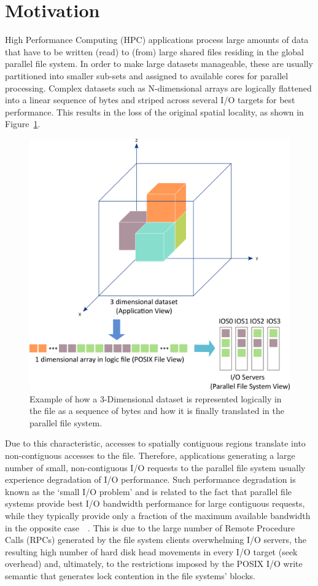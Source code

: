 \section{Motivation}
\label{sec: motivation}
High Performance Computing (HPC) applications process large amounts of data that have to be written (read) to (from) large shared files residing in the global parallel file system. In order to make large datasets manageable, these are usually partitioned into smaller sub-sets and assigned to available cores for parallel processing. Complex datasets such as N-dimensional arrays are logically flattened into a linear sequence of bytes and striped across several I/O targets for best performance. This results in the loss of the original spatial locality, as shown in Figure~\ref{fig: small-io}. 
\begin{figure}[!htb]
\centering
\includegraphics[width=\textwidth]{chapters/chapter3/figures/small-io}
\caption{Example of how a 3-Dimensional dataset is represented logically in the file as a sequence of bytes and how it is finally translated in the parallel file system.}
\label{fig: small-io}
\end{figure}
Due to this characteristic, accesses to spatially contiguous regions translate into non-contiguous accesses to the file. Therefore, applications generating a large number of small, non-contiguous I/O requests to the parallel file system usually experience degradation of I/O performance. Such performance degradation is known as the `small I/O problem' and is related to the fact that parallel file systems provide best I/O bandwidth performance for large contiguous requests, while they typically provide only a fraction of the maximum available bandwidth in the opposite case~\cite{ChingCLP06}~\cite{HeSSYT11}. This is due to the large number of Remote Procedure Calls (RPCs) generated by the file system clients overwhelming I/O servers, the resulting high number of hard disk head movements in every I/O target (seek overhead) and, ultimately, to the restrictions imposed by the POSIX I/O write semantic that generates lock contention in the file systems' blocks.

